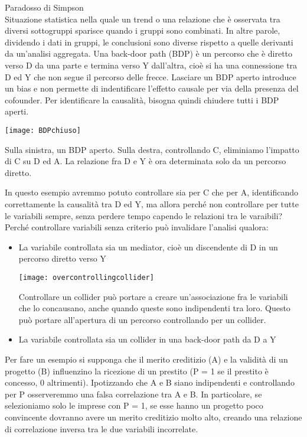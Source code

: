 \large Paradosso di Simpson
\normalsize
\\Situazione statistica nella quale un trend o una relazione che è osservata tra diversi 
sottogruppi sparisce quando i gruppi sono combinati. In altre parole, dividendo i dati in 
gruppi, le conclusioni sono diverse rispetto a quelle derivanti da un’analisi aggregata.
Una back-door path (BDP) è un percorso che è diretto verso D da una parte e termina verso Y
dall'altra, cioè si ha una connessione tra D ed Y che non segue il percorso delle frecce.
Lasciare un BDP aperto introduce un bias e non permette di indentificare l'effetto causale
per via della presenza del cofounder. Per identificare la causalità, bisogna quindi chiudere
tutti i BDP aperti. 
\begin{marginfigure}
    \texttt{[image: BDPchiuso]}
    \caption{Sulla sinistra, un BDP aperto. Sulla destra, controllando C, eliminiamo l'impatto 
        di C su D ed A. La relazione fra D e Y è ora determinata solo da un percorso diretto.}
\end{marginfigure}
In questo esempio avremmo potuto controllare sia per C che per A, identificando correttamente
la causalità tra D ed Y, ma allora perché non controllare per tutte le variabili sempre, senza
perdere tempo capendo le relazioni tra le varaibili?
Perché controllare variabili senza criterio può invalidare l'analisi qualora: 
\begin{itemize}
\begin{marginfigure}
    \texttt{[image: overcontrolling]}
    \caption{Se controllassimo per C, perderemmo l'intero (caso 1) o parte (caso 2) impatto
    di D su Y}
\end{marginfigure}
    \item La variabile controllata sia un mediator, cioè un discendente di D in un percorso 
        diretto verso Y
\begin{marginfigure}
    \texttt{[image: overcontrollingcollider]}
    \caption{Controllare un collider può portare a creare un'associazione fra le variabili che 
    lo concausano, anche quando queste sono indipendenti tra loro. Questo può portare all'apertura
di un percorso controllando per un collider.}
\end{marginfigure}
    \item La variabile controllata sia un collider in una back-door path da D a Y
\end{itemize}
Per fare un esempio si supponga che il merito creditizio (A) e la validità di un progetto (B)
influenzino la ricezione di un prestito (P = 1 se il prestito è concesso, 0 altrimenti). 
Ipotizzando che A e B siano indipendenti e controllando per P osserveremmo una falsa correlazione 
tra A e B. In particolare, se selezioniamo solo le imprese con P = 1, se esse hanno un progetto
poco convincente dovranno avere un merito creditizio molto alto, creando una relazione di correlazione
inversa tra le due variabili incorrelate.
